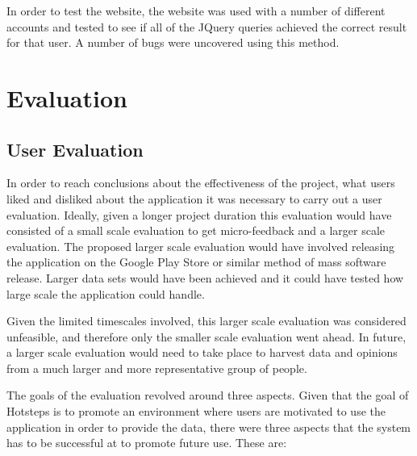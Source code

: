 \documentclass{l4proj}
\begin{document}
In order to test the website, the website was used with a number of different accounts and tested to see if all of the JQuery queries achieved the correct result for that user. A number of bugs were uncovered using this method.


\chapter{Evaluation}

\section{User Evaluation}

In order to reach conclusions about the effectiveness of the project, what users liked and disliked about the application it was necessary to carry out a user evaluation. Ideally, given a longer project duration this evaluation would have consisted of a small scale evaluation to get micro-feedback and a larger scale evaluation. The proposed larger scale evaluation would have involved releasing the application on the Google Play Store or similar method of mass software release. Larger data sets would have been achieved and it could have tested how large scale the application could handle.

Given the limited timescales involved, this larger scale evaluation was considered unfeasible, and therefore only the smaller scale evaluation went ahead. In future, a larger scale evaluation would need to take place to harvest data and opinions from a much larger and more representative group of people.

The goals of the evaluation revolved around three aspects. Given that the goal of Hotsteps is to promote an environment where users are motivated to use the application in order to provide the data, there were three aspects that the system has to be successful at to promote future use. These are:
\end{document}
